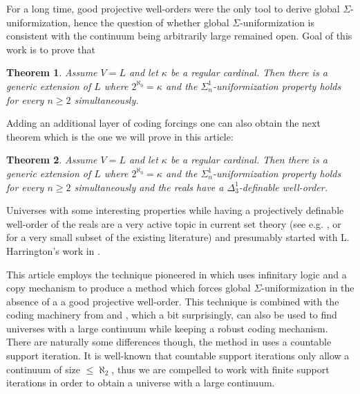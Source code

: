 \documentclass[a4paper,11pt]{article}
\newtheorem{theorem}{Theorem}[section]
\begin{document}
For a long time, good projective well-orders were the only tool to derive global $\Sigma$-uniformization, hence the question of whether global $\Sigma$-uniformization is consistent with the continuum being arbitrarily large remained open. Goal of this work is to prove that 
\begin{theorem}
Assume $V=L$ and let $\kappa$ be a regular cardinal. Then there is a generic extension of $L$ where $2^{\aleph_0}= \kappa$ and the $\Sigma^1_n$-uniformization property holds for every $n \ge 2$ simultaneously.
\end{theorem}
Adding an additional layer of coding forcings one can also obtain the next theorem which is the one we will prove in this article:
\begin{theorem}
Assume $V=L$ and let $\kappa$ be a regular cardinal. Then there is a generic extension of $L$ where $2^{\aleph_0}= \kappa$ and the $\Sigma^1_n$-uniformization property holds for every $n \ge 2$ simultaneously and the reals have a $\Delta^1_3$-definable well-order.
\end{theorem}
Universes with some interesting properties while having  a projectively definable well-order of the reals are a very active topic in current set theory (see e.g. \cite{Fischer Friedman Zdomskyy}, \cite{Fischer Friedman Khomskii} or \cite{Friedman Hoffelner} for a very small subset of the existing literature) and presumably started with L. Harrington's work in \cite{Harrington}.

This article employs the technique pioneered in \cite{BPFA and Global Uniformization} which uses infinitary logic and a copy mechanism to produce a method which forces global $\Sigma$-uniformization in the absence of a a good projective well-order. This technique is combined with the coding machinery from \cite{Ho2} and \cite{Ho4}, which a bit surprisingly, can also be used to find universes with a large continuum while keeping a robust coding mechanism.
There are naturally some differences though, the method in  \cite{BPFA and Global Uniformization} uses a countable support iteration. It is well-known that countable support iterations only allow a continuum of size $\le \aleph_2$, thus we are compelled to work with finite support iterations in order to obtain a universe with a large continuum.
\end{document}
